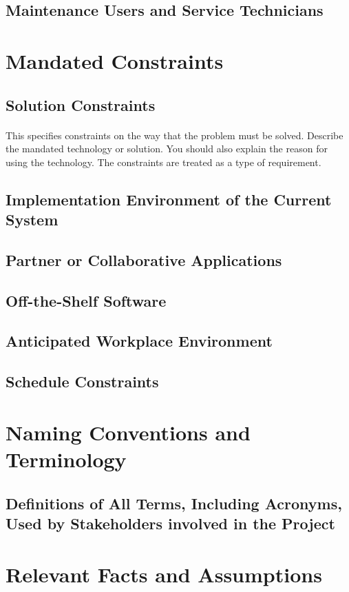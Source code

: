 \documentclass[12pt,a4paper]{article}
\begin{document}
\subsection{Maintenance Users and Service Technicians}
\pagebreak
\section{Mandated Constraints}
\subsection{Solution Constraints}
\paragraph{}
This specifies constraints on the way that the problem must be solved. Describe the mandated technology or solution. You should also explain the reason for using the technology. The constraints are treated as a type of requirement.
\subsection{Implementation Environment of the Current System}
\subsection{Partner or Collaborative Applications}
\subsection{Off-the-Shelf Software}
\subsection{Anticipated Workplace Environment}
\subsection{Schedule Constraints}
\pagebreak
\section{Naming Conventions and Terminology}
\subsection{Definitions of All Terms, Including Acronyms, Used by Stakeholders involved in the Project}
\pagebreak
\section{Relevant Facts and Assumptions}
\end{document}
